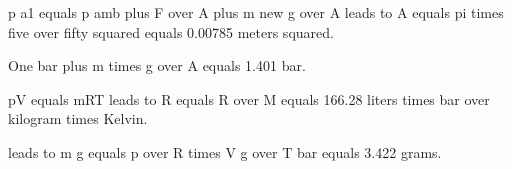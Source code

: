 p a1 equals p amb plus F over A plus m new g over A leads to A equals pi times five over fifty squared equals 0.00785 meters squared.

One bar plus m times g over A equals 1.401 bar.

pV equals mRT leads to R equals R over M equals 166.28 liters times bar over kilogram times Kelvin.

leads to m g equals p over R times V g over T bar equals 3.422 grams.